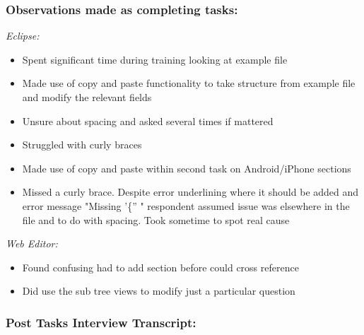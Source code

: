 \documentclass{report}
\begin{document}
\subsubsection*{Observations made as completing tasks:}

\emph{Eclipse:}
\begin{itemize}
\item Spent significant time during training looking at example file
\item Made use of copy and paste functionality to take structure from example file and modify the relevant fields
\item Unsure about spacing and asked several times if mattered
\item Struggled with curly braces
\item Made use of copy and paste within second task on Android/iPhone sections
\item Missed a curly brace. Despite error underlining where it should be added and error message "Missing '\{'' " respondent assumed issue was elsewhere in the file and to do with spacing. Took sometime to spot real cause
\end{itemize}
\emph{Web Editor:}
\begin{itemize}
\item Found confusing had to add section before could cross reference
\item Did use the sub tree views to modify just a particular question
\end{itemize}

\subsubsection*{Post Tasks Interview Transcript:}
\end{document}
